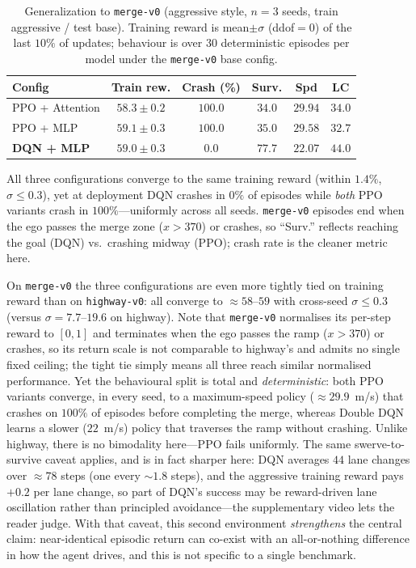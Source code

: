 \documentclass[conference]{IEEEtran}
\newcommand{\code}[1]{\texttt{#1}}
\begin{document}
\begin{table}[t]
\caption{Generalization to \code{merge-v0} (aggressive style, $n=3$ seeds, train aggressive / test base). Training reward is mean$\pm\sigma$ (ddof$=0$) of the last $10\%$ of updates; behaviour is over 30 deterministic episodes per model under the \code{merge-v0} base config.}
\label{tab:merge}
\centering
\small
\begin{tabular}{@{}lccccc@{}}
\toprule
Config & Train rew. & Crash (\%) & Surv. & Spd & LC \\
\midrule
PPO + Attention & $58.3{\pm}0.2$ & $100.0$ & $34.0$ & $29.94$ & $34.0$ \\
PPO + MLP       & $59.1{\pm}0.3$ & $100.0$ & $35.0$ & $29.58$ & $32.7$ \\
\textbf{DQN + MLP} & $59.0{\pm}0.3$ & $\mathbf{0.0}$ & $77.7$ & $22.07$ & $44.0$ \\
\bottomrule
\end{tabular}
\vspace{2pt}
\parbox{\columnwidth}{\footnotesize All three configurations converge to the same
training reward (within $1.4\%$, $\sigma\leq0.3$), yet at deployment DQN crashes
in $0\%$ of episodes while \emph{both} PPO variants crash in $100\%$---uniformly
across all seeds. \code{merge-v0} episodes end when the ego passes the merge zone
($x>370$) or crashes, so ``Surv.'' reflects reaching the goal (DQN) vs.\ crashing
midway (PPO); crash rate is the cleaner metric here.}
\end{table}

On \code{merge-v0} the three configurations are even more tightly tied on
training reward than on \code{highway-v0}: all converge to ${\approx}58$--$59$
with cross-seed $\sigma\leq0.3$ (versus $\sigma=7.7$--$19.6$ on highway). Note
that \code{merge-v0} normalises its per-step reward to $[0,1]$ and terminates
when the ego passes the ramp ($x>370$) or crashes, so its return scale is not
comparable to highway's and admits no single fixed ceiling; the tight tie simply
means all three reach similar normalised performance. Yet the behavioural split
is total and \emph{deterministic}: both PPO variants converge, in every seed, to
a maximum-speed policy (${\approx}29.9$~m/s) that crashes on $100\%$ of episodes
before completing the merge, whereas Double DQN learns a slower ($22$~m/s) policy
that traverses the ramp without crashing. Unlike highway, there is no bimodality
here---PPO fails uniformly. The same swerve-to-survive caveat applies, and is in
fact sharper here: DQN averages $44$ lane changes over ${\approx}78$ steps (one
every ${\sim}1.8$ steps), and the aggressive training reward pays $+0.2$ per lane
change, so part of DQN's success may be reward-driven lane oscillation rather
than principled avoidance---the supplementary video lets the reader judge. With
that caveat, this second environment \emph{strengthens} the central claim:
near-identical episodic return can co-exist with an all-or-nothing difference in
how the agent drives, and this is not specific to a single benchmark.
\end{document}

